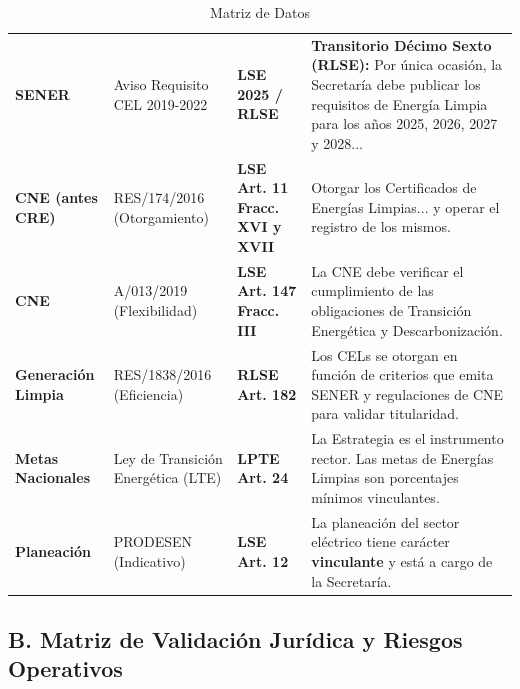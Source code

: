 \documentclass{cel}
\begin{document}
\vspace{0.3cm}
\begin{tabladoradoLargo}
\renewcommand{\tabularxcolumn}[1]{p{#1}}
\begin{xltabular}{\textwidth}{|X|X|X|X|}
\caption{Matriz de Datos} \\
\toprule
{}  &  &  &  \\
\midrule
\endhead
\textbf{SENER} & Aviso Requisito CEL 2019-2022 & \textbf{LSE 2025 / RLSE} & \textbf{Transitorio Décimo Sexto (RLSE):} \textquotedbl{}Por única ocasión, la Secretaría debe publicar los requisitos de Energía Limpia para los años 2025, 2026, 2027 y 2028...\textquotedbl{} \\ \hline
\textbf{CNE (antes CRE)} & RES/174/2016 (Otorgamiento) & \textbf{LSE Art. 11 Fracc. XVI y XVII} & \textquotedbl{}Otorgar los Certificados de Energías Limpias... y operar el registro de los mismos\textquotedbl{}. \\ \hline
\textbf{CNE} & A/013/2019 (Flexibilidad) & \textbf{LSE Art. 147 Fracc. III} & La CNE debe verificar el cumplimiento de las obligaciones de Transición Energética y Descarbonización. \\ \hline
\textbf{Generación Limpia} & RES/1838/2016 (Eficiencia) & \textbf{RLSE Art. 182} & Los CELs se otorgan en función de criterios que emita SENER y regulaciones de CNE para validar titularidad. \\ \hline
\textbf{Metas Nacionales} & Ley de Transición Energética (LTE) & \textbf{LPTE Art. 24} & La Estrategia es el instrumento rector. Las metas de Energías Limpias son porcentajes mínimos vinculantes. \\ \hline
\textbf{Planeación} & PRODESEN (Indicativo) & \textbf{LSE Art. 12} & \textquotedbl{}La planeación del sector eléctrico tiene carácter \textbf{vinculante} y está a cargo de la Secretaría\textquotedbl{}. \\ \hline
\bottomrule
\end{xltabular}
\end{tabladoradoLargo}


\subsection{B. Matriz de Validación Jurídica y Riesgos Operativos}
\nopagebreak
\end{document}
